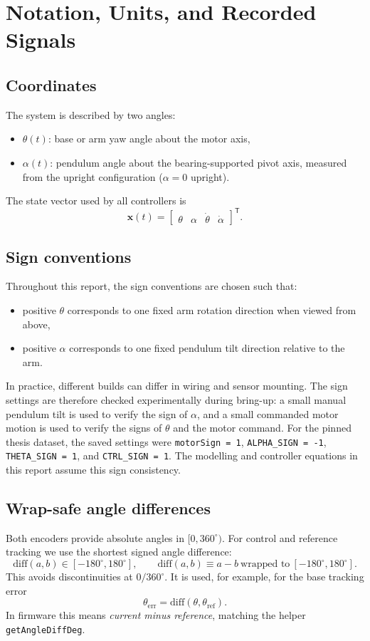 \chapter{Notation, Units, and Recorded Signals}
\label{ch:notation}

\section{Coordinates}
The system is described by two angles:
\begin{itemize}
  \item $\theta(t)$: base or arm yaw angle about the motor axis,
  \item $\alpha(t)$: pendulum angle about the bearing-supported pivot axis, measured from the upright configuration ($\alpha=0$ upright).
\end{itemize}
The state vector used by all controllers is
\[
\mathbf{x}(t)=\begin{bmatrix}\theta & \alpha & \dot{\theta} & \dot{\alpha}\end{bmatrix}^\mathsf{T}.
\]

\section{Sign conventions}
Throughout this report, the sign conventions are chosen such that:
\begin{itemize}
  \item positive $\theta$ corresponds to one fixed arm rotation direction when viewed from above,
  \item positive $\alpha$ corresponds to one fixed pendulum tilt direction relative to the arm.
\end{itemize}
In practice, different builds can differ in wiring and sensor mounting. The sign settings are therefore checked experimentally during bring-up: a small manual pendulum tilt is used to verify the sign of $\alpha$, and a small commanded motor motion is used to verify the signs of $\theta$ and the motor command. For the pinned thesis dataset, the saved settings were \texttt{motorSign = 1}, \texttt{ALPHA\_SIGN = -1}, \texttt{THETA\_SIGN = 1}, and \texttt{CTRL\_SIGN = 1}. The modelling and controller equations in this report assume this sign consistency.

\section{Wrap-safe angle differences}
Both encoders provide absolute angles in $[0,360^\circ)$. For control and reference tracking we use the shortest signed angle difference:
\[
\mathrm{diff}(a,b)\in[-180^\circ,180^\circ],\qquad \mathrm{diff}(a,b)\equiv a-b\ \text{wrapped to}\ [-180^\circ,180^\circ].
\]
This avoids discontinuities at $0/360^\circ$. It is used, for example, for the base tracking error
\[
\theta_{\mathrm{err}}=\mathrm{diff}(\theta,\theta_{\mathrm{ref}}).
\]
In firmware this means \emph{current minus reference}, matching the helper \texttt{getAngleDiffDeg}.

